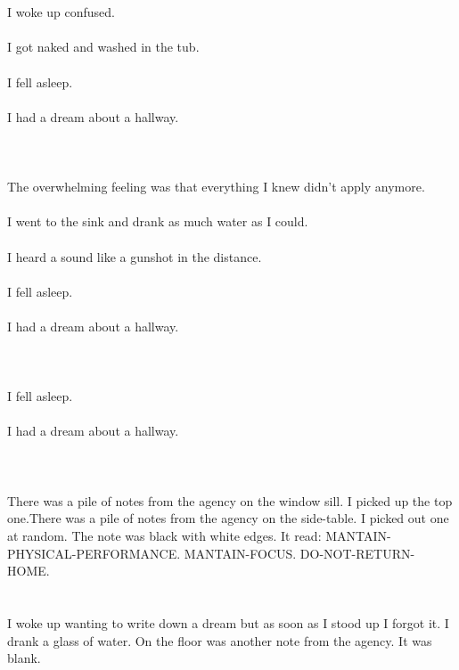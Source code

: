\documentclass{article}
\begin{document}
    \section{}
    I woke up confused.\\\\I got naked and washed in the tub.\\\\I fell asleep.\\\\I had a dream about a hallway.\\\\ 
    \newpage
    
    \section{}
    The overwhelming feeling was that everything I knew didn't apply anymore.\\\\I went to the sink and drank as much water as I could.\\\\I heard a sound like a gunshot in the distance.\\\\I fell asleep.\\\\I had a dream about a hallway.\\\\ 
    \newpage
    
    \section{}
    I fell asleep.\\\\I had a dream about a hallway.\\\\ 
    \newpage
    
    \section{}
    There was a pile of notes from the agency on the window sill. I picked up the top one.There was a pile of notes from the agency on the side-table. I picked out one at random. The note was black with white edges. It read: MANTAIN-PHYSICAL-PERFORMANCE. MANTAIN-FOCUS. DO-NOT-RETURN-HOME.  
    \newpage
    
    \section{}
    I woke up wanting to write down a dream but as soon as I stood up I forgot it. I drank a glass of water. On the floor was another note from the agency. It was blank.  
    \newpage
    
\end{document}
